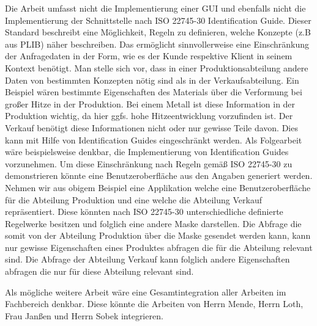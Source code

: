 Die Arbeit umfasst nicht die Implementierung einer GUI und ebenfalls nicht die Implementierung der Schnittstelle nach ISO 22745-30 Identification Guide. Dieser Standard beschreibt eine Möglichkeit, Regeln zu definieren, welche Konzepte (z.B aus PLIB) näher beschreiben. Das ermöglicht sinnvollerweise eine Einschränkung der Anfragedaten in der Form, wie es der Kunde respektive Klient in seinem Kontext benötigt. Man stelle sich vor, dass in einer Produktionsabteilung andere Daten von bestimmten Konzepten nötig sind als in der Verkaufsabteilung. Ein Beispiel wären bestimmte Eigenschaften des Materials über die Verformung bei großer Hitze in der Produktion. Bei einem Metall ist diese Information in der Produktion wichtig, da hier ggfs. hohe Hitzeentwicklung vorzufinden ist. Der Verkauf benötigt diese Informationen nicht oder nur gewisse Teile davon. Dies kann mit Hilfe von Identification Guides eingeschränkt werden. 
Als Folgearbeit wäre beispielsweise denkbar, die Implementierung von Identification Guides vorzunehmen. Um diese Einschränkung nach Regeln gemäß ISO 22745-30 zu demonstrieren könnte eine Benutzeroberfläche aus den Angaben generiert werden. Nehmen wir aus obigem Beispiel eine Applikation welche eine Benutzeroberfläche für die Abteilung Produktion und eine welche die Abteilung Verkauf repräsentiert. Diese könnten nach ISO 22745-30 unterschiedliche definierte Regelwerke besitzen und folglich eine andere Maske darstellen. Die Abfrage die somit von der Abteilung Produktion über die Maske gesendet werden kann, kann nur gewisse Eigenschaften eines Produktes abfragen die für die Abteilung relevant sind. Die Abfrage der Abteilung Verkauf kann folglich andere Eigenschaften abfragen die nur für diese Abteilung relevant sind.

Als mögliche weitere Arbeit wäre eine Gesamtintegration aller Arbeiten im Fachbereich denkbar. Diese könnte die Arbeiten von Herrn Mende, Herrn Loth, Frau Janßen und Herrn Sobek integrieren.  

